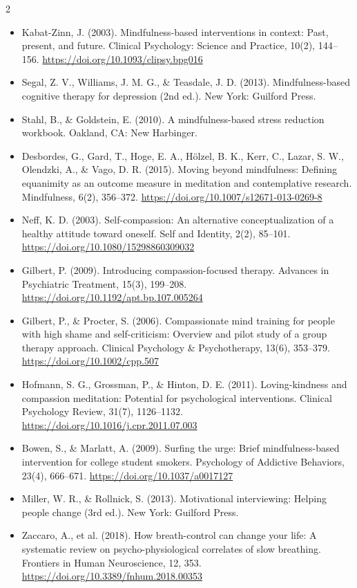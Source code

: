 \documentclass[10pt]{article}
\theoremstyle{definition}
\theoremstyle{remark}
\begin{document}
\begin{multicols}{2}
\begin{itemize}[leftmargin=1em,itemsep=0pt,topsep=1pt,parsep=0pt]
\item Kabat-Zinn, J. (2003). Mindfulness-based interventions in context: Past, present, and future. Clinical Psychology: Science and Practice, 10(2), 144--156. \url{https://doi.org/10.1093/clipsy.bpg016}
\item Segal, Z. V., Williams, J. M. G., \& Teasdale, J. D. (2013). Mindfulness-based cognitive therapy for depression (2nd ed.). New York: Guilford Press.
\item Stahl, B., \& Goldstein, E. (2010). A mindfulness-based stress reduction workbook. Oakland, CA: New Harbinger.
\item Desbordes, G., Gard, T., Hoge, E. A., Hölzel, B. K., Kerr, C., Lazar, S. W., Olendzki, A., \& Vago, D. R. (2015). Moving beyond mindfulness: Defining equanimity as an outcome measure in meditation and contemplative research. Mindfulness, 6(2), 356--372. \url{https://doi.org/10.1007/s12671-013-0269-8}
\item Neff, K. D. (2003). Self-compassion: An alternative conceptualization of a healthy attitude toward oneself. Self and Identity, 2(2), 85--101. \url{https://doi.org/10.1080/15298860309032}
\item Gilbert, P. (2009). Introducing compassion-focused therapy. Advances in Psychiatric Treatment, 15(3), 199--208. \url{https://doi.org/10.1192/apt.bp.107.005264}
\item Gilbert, P., \& Procter, S. (2006). Compassionate mind training for people with high shame and self-criticism: Overview and pilot study of a group therapy approach. Clinical Psychology \& Psychotherapy, 13(6), 353--379. \url{https://doi.org/10.1002/cpp.507}
\item Hofmann, S. G., Grossman, P., \& Hinton, D. E. (2011). Loving-kindness and compassion meditation: Potential for psychological interventions. Clinical Psychology Review, 31(7), 1126--1132. \url{https://doi.org/10.1016/j.cpr.2011.07.003}
\item Bowen, S., \& Marlatt, A. (2009). Surfing the urge: Brief mindfulness-based intervention for college student smokers. Psychology of Addictive Behaviors, 23(4), 666--671. \url{https://doi.org/10.1037/a0017127}
\item Miller, W. R., \& Rollnick, S. (2013). Motivational interviewing: Helping people change (3rd ed.). New York: Guilford Press.
\item Zaccaro, A., et al. (2018). How breath-control can change your life: A systematic review on psycho-physiological correlates of slow breathing. Frontiers in Human Neuroscience, 12, 353. \url{https://doi.org/10.3389/fnhum.2018.00353}
\end{itemize}

\end{multicols}
\end{document}
